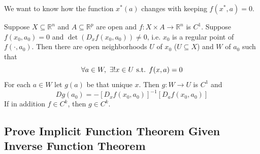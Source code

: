 \documentclass[11pt]{elegantbook}
\begin{document}
We want to know how the function $x^*(a)$ changes with keeping $f(x^*,a)=0$.
\begin{theorem}
    Suppose $X \subseteq \mathbb{R}^n$ and $A \subseteq \mathbb{R}^p$ are open and $f : X \times A \rightarrow \mathbb{R}^n$ is $C^1$. Suppose $f(x_0, a_0) = 0$ and $\det(D_x f(x_0, a_0)) \neq 0$, i.e. $x_0$ is a regular point of $f(\cdot, a_0)$. Then there are open neighborhoods $U$ of $x_0$ ($U \subseteq X$) and $W$ of $a_0$ such that
    $$\forall a\in W,\ \exists ! x\in U \textnormal{ s.t. }f(x,a)=0$$
    For each $a \in W$ let $g(a)$ be that unique $x$. Then $g : W \rightarrow U$ is $C^1$ and $$Dg(a_0)=-[D_x f(x_0, a_0)]^{-1}[D_a f(x_0, a_0)]$$
    If in addition $f \in C^k$, then $g \in C^k$.
\end{theorem}
\subsection{Prove Implicit Function Theorem Given Inverse Function Theorem}
\end{document}
